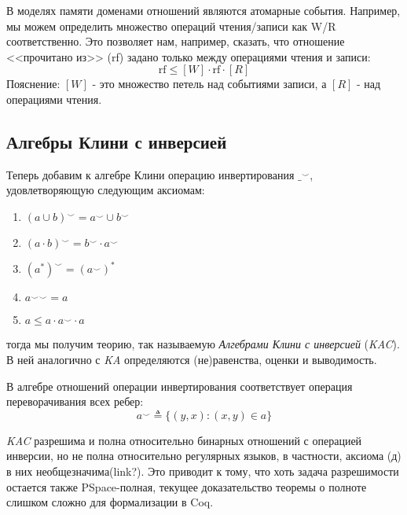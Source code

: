 \documentclass[times
              ]{itmo-student-thesis}
\begin{document}
      В моделях памяти доменами отношений являются атомарные события. Например, мы можем определить множество
      операций чтения/записи как W/R соответственно.
      Это позволяет нам, например, сказать, что отношение <<прочитано из>> (rf) задано только между
      операциями чтения и записи\cite{rc11}:
      $$ \text{rf} \leq [W] \cdot \text{rf} \cdot [R] $$
      Пояснение: $ [W] $ - это множество петель над событиями записи, а $[R]$ - над операциями чтения.


    \subsection{Алгебры Клини с инверсией}
      Теперь добавим к алгебре Клини операцию инвертирования $ \_^{\smile} $, удовлетворяющую следующим аксиомам:
      \begin{enumerate}
        \item $ (a \cup b)^{\smile} = a^{\smile} \cup b^{\smile} $
        \item $ (a \cdot b)^{\smile} = b^{\smile} \cdot a^{\smile} $
        \item $ (a^*)^{\smile} = (a^{\smile})^* $
        \item $ {a^{\smile}}^{\smile} = a $
        \item $ a \leq a \cdot a^{\smile} \cdot a $
      \end{enumerate}
      тогда мы получим теорию, так называемую \textit{Алгебрами Клини с инверсией} (\textit{KAC}).
      В ней аналогично с \textit{KA} определяются (не)равенства, оценки и выводимость.

      В алгебре отношений операции инвертирования соответствует операция переворачивания всех ребер:
      $$ a^\smile \triangleq \{ (y, x): (x, y) \in a \} $$

      \textit{KAC} разрешима и полна относительно бинарных отношений с операцией инверсии, но не полна
      относительно регулярных языков, в частности, аксиома (д) в них необщезначима(link?).
      Это приводит к тому, что хоть задача разрешимости остается также PSpace-полная, текущее
      доказательство теоремы о полноте слишком сложно для формализации в Coq\cite{AlgebrasOfRelation}.
\end{document}
